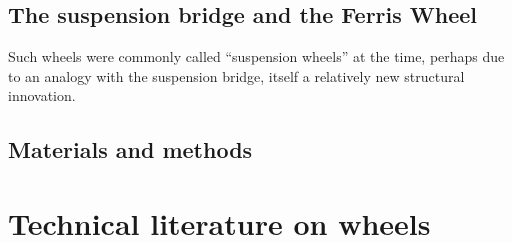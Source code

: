 \documentclass[../thesis.tex]{subfiles}
\begin{document}
\subsection{The suspension bridge and the Ferris Wheel}

Such wheels were commonly called ``suspension wheels'' at the time, perhaps due to an analogy with the suspension bridge, itself a relatively new structural innovation\cite{SciAm}.

\subsection{Materials and methods}

\section{Technical literature on wheels}
\end{document}
